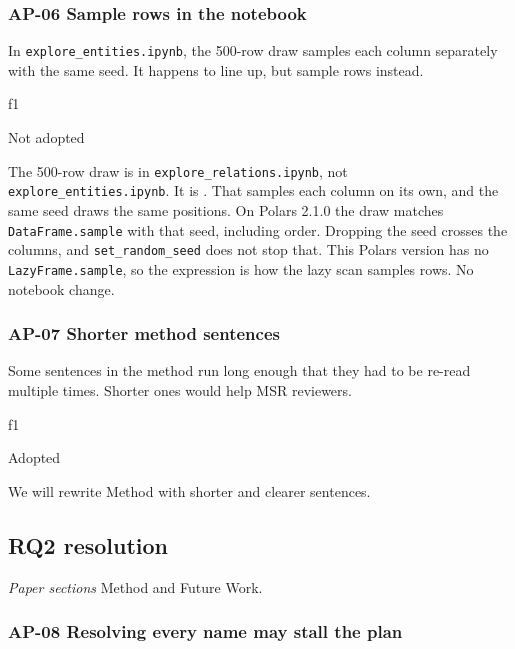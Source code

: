 \subsubsection*{AP-06 Sample rows in the notebook}
\label{ap:06}

\begin{description}[leftmargin=0pt]
  \item[Point] In \texttt{explore\_entities.ipynb}, the 500-row draw samples each column separately with the same seed. It happens to line up, but sample rows instead.
  \item[Source] f1
  \item[Decision] Not adopted
  \item[Reasoning] The 500-row draw is in \texttt{explore\_relations.ipynb}, not \texttt{explore\_entities.ipynb}. It is . That samples each column on its own, and the same seed draws the same positions. On Polars 2.1.0 the draw matches \texttt{DataFrame.sample} with that seed, including order. Dropping the seed crosses the columns, and \texttt{set\_random\_seed} does not stop that. This Polars version has no \texttt{LazyFrame.sample}, so the expression is how the lazy scan samples rows. No notebook change.
\end{description}

\subsubsection*{AP-07 Shorter method sentences}
\label{ap:07}

\begin{description}[leftmargin=0pt]
  \item[Point] Some sentences in the method run long enough that they had to be re-read multiple times. Shorter ones would help MSR reviewers.
  \item[Source] f1
  \item[Decision] Adopted
  \item[Reasoning] We will rewrite Method with shorter and clearer sentences.
\end{description}

\subsection*{RQ2 resolution}

\textit{Paper sections} Method and Future Work.

\subsubsection*{AP-08 Resolving every name may stall the plan}
\label{ap:08}

